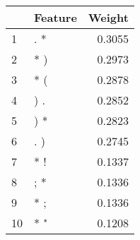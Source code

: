 \begin{tabular}{llr}
\toprule
{} & Feature &  Weight \\
\midrule
1  &     . * &  0.3055 \\
2  &     * ) &  0.2973 \\
3  &     * ( &  0.2878 \\
4  &     ) . &  0.2852 \\
5  &     ) * &  0.2823 \\
6  &     . ) &  0.2745 \\
7  &     * ! &  0.1337 \\
8  &     ; * &  0.1336 \\
9  &     * ; &  0.1336 \\
10 &     * " &  0.1208 \\
\bottomrule
\end{tabular}

